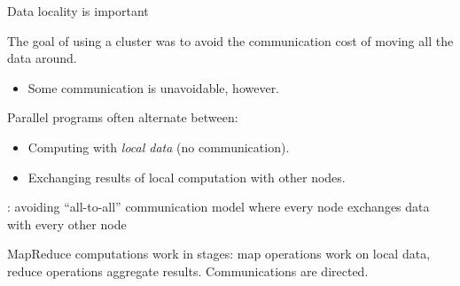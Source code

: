 %
%


\begin{frame}{Data locality is important}

The goal of using a cluster was to avoid the communication cost of moving all the data around.
\begin{itemize}[-]
\item Some communication is unavoidable, however.
\end{itemize}

Parallel programs often alternate between:
\begin{itemize}[-,noitemsep]
\item Computing with \emph{local data} (no communication).
\item Exchanging results of local computation with other nodes.
\end{itemize}


: avoiding ``all-to-all'' communication model where every node exchanges data with every other node

\begin{block}{}
\alert{MapReduce computations work in stages}: map operations work on local data, reduce operations aggregate results. Communications are directed.
\end{block}
\end{frame}

%
%


